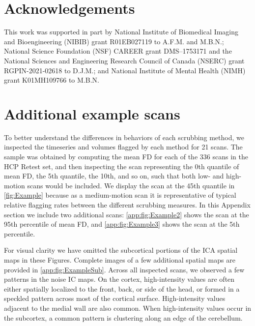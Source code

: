 \documentclass{article}
\begin{document}
\section*{Acknowledgements}

This work was supported in part by National Institute of Biomedical Imaging and Bioengineering (NIBIB) grant R01EB027119 to A.F.M. and M.B.N.; National Science Foundation (NSF) CAREER grant DMS–1753171 and the National Sciences and Engineering Research Council of Canada (NSERC) grant RGPIN-2021-02618 to D.J.M.; and National Institute of Mental Health (NIMH) grant K01MH109766 to M.B.N.	 





\clearpage

\appendix 


\renewcommand\thefigure{\thesection.\arabic{figure}}    
\setcounter{figure}{0} 
\setcounter{page}{1}


\section{Additional example scans}
\label{app:additional_scans}

To better understand the differences in behaviors of each scrubbing method, we inspected the timeseries and volumes flagged by each method for 21 scans. The sample was obtained by computing the mean FD for each of the 336 scans in the HCP Retest set, and then inspecting the scan representing the 0th quantile of mean FD, the 5th quantile, the 10th, and so on, such that both low- and high-motion scans would be included. We display the scan at the 45th quantile in \autoref{fig:Example} because as a medium-motion scan it is representative of typical relative flagging rates between the different scrubbing measures. In this Appendix section we include two additional scans: \autoref{app:fig:Example2} shows the scan at the 95th percentile of mean FD, and \autoref{app:fig:Example3} shows the scan at the 5th percentile. 

For visual clarity we have omitted the subcortical portions of the ICA spatial maps in these Figures. Complete images of a few additional spatial maps are provided in \autoref{app:fig:ExampleSub}. Across all inspected scans, we observed a few patterns in the noise IC maps. On the cortex, high-intensity values are often either spatially localized to the front, back, or side of the head, or formed in a speckled pattern across most of the cortical surface. High-intensity values adjacent to the medial wall are also common. When high-intensity values occur in the subcortex, a common pattern is clustering along an edge of the cerebellum. 
\end{document}
